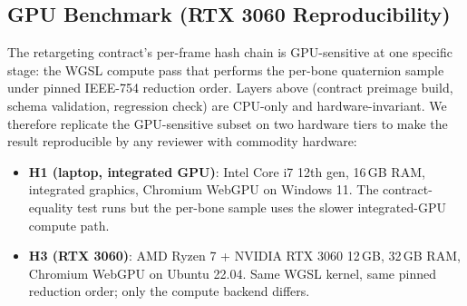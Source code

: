 \documentclass[sigconf,nonacm]{acmart}
\begin{document}
\subsection{GPU Benchmark (RTX 3060 Reproducibility)}
\label{sec:eval:gpu}

The retargeting contract's per-frame hash chain is GPU-sensitive at one
specific stage: the WGSL compute pass that performs the per-bone
quaternion sample under pinned IEEE-754 reduction order. Layers above
(contract preimage build, schema validation, regression check) are
CPU-only and hardware-invariant. We therefore replicate the
GPU-sensitive subset on two hardware tiers to make the result
reproducible by any reviewer with commodity hardware:

\begin{itemize}
  \item \textbf{H1 (laptop, integrated GPU)}: Intel Core i7 12th gen, 16\,GB
    RAM, integrated graphics, Chromium WebGPU on Windows 11. The
    contract-equality test runs but the per-bone sample uses the slower
    integrated-GPU compute path.
  \item \textbf{H3 (RTX 3060)}: AMD Ryzen 7 + NVIDIA RTX 3060 12\,GB,
    32\,GB RAM, Chromium WebGPU on Ubuntu 22.04. Same WGSL kernel, same
    pinned reduction order; only the compute backend differs.
\end{itemize}
\end{document}
